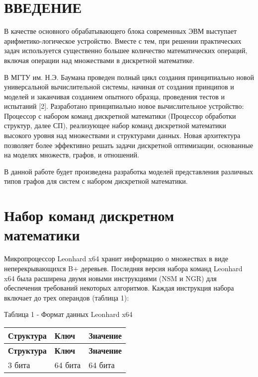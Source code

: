 \hypertarget{md_docs__xD0_x93_xD1_x80_xD0_xB0_xD1_x84_xD0_xBE_xD0_xB2_xD1_x8B_xD0_xB5__xD0_xBC_xD0_xBE_xD0_xB4_xD0_xB5_xD0_xBB_xD0_xB8_autotoc_md0}{}\section{ВВЕДЕНИЕ}\label{md_docs__xD0_x93_xD1_x80_xD0_xB0_xD1_x84_xD0_xBE_xD0_xB2_xD1_x8B_xD0_xB5__xD0_xBC_xD0_xBE_xD0_xB4_xD0_xB5_xD0_xBB_xD0_xB8_autotoc_md0}
В качестве основного обрабатывающего блока современных ЭВМ выступает арифметико-\/логическое устройство. Вместе с тем, при решении практических задач используется существенно большее количество математических операций, включая операции над множествами в дискретной математике.

В МГТУ им. Н.\+Э. Баумана проведен полный цикл создания принципиально новой универсальной вычислительной системы, начиная от создания принципов и моделей и заканчивая созданием опытного образца, проведения тестов и испытаний \mbox{[}2\mbox{]}. Разработано принципиально новое вычислительное устройство\+: Процессор с набором команд дискретной математики (Процессор обработки структур, далее СП), реализующее набор команд дискретной математики высокого уровня над множествами и структурами данных. Новая архитектура позволяет более эффективно решать задачи дискретной оптимизации, основанные на моделях множеств, графов, и отношений.

В данной работе будет произведена разработка моделей представления различных типов графов для систем с набором дискретной математики.\hypertarget{md_docs__xD0_x93_xD1_x80_xD0_xB0_xD1_x84_xD0_xBE_xD0_xB2_xD1_x8B_xD0_xB5__xD0_xBC_xD0_xBE_xD0_xB4_xD0_xB5_xD0_xBB_xD0_xB8_autotoc_md1}{}\section{Набор команд дискретном математики}\label{md_docs__xD0_x93_xD1_x80_xD0_xB0_xD1_x84_xD0_xBE_xD0_xB2_xD1_x8B_xD0_xB5__xD0_xBC_xD0_xBE_xD0_xB4_xD0_xB5_xD0_xBB_xD0_xB8_autotoc_md1}
Микропроцессор Leonhard x64 хранит информацию о множествах в виде неперекрывающихся B+ деревьев. Последняя версия набора команд Leonhard x64 была расширена двумя новыми инструкциями (N\+SM и N\+GR) для обеспечения требований некоторых алгоритмов. Каждая инструкция набора включает до трех операндов (таблица 1)\+:

Таблица 1 -\/ Формат данных Leonhard x64

\tabulinesep=1mm
\begin{longtabu} spread 0pt [c]{*{3}{|X[-1]}|}
\hline
\rowcolor{\tableheadbgcolor}\textbf{ Структура }&\textbf{ Ключ }&\textbf{ Значение  }\\
\endfirsthead
\hline
\endfoot
\hline
\rowcolor{\tableheadbgcolor}\textbf{ Структура }&\textbf{ Ключ }&\textbf{ Значение  }\\
 бита &64 бита &64 бита \\
\end{longtabu}


